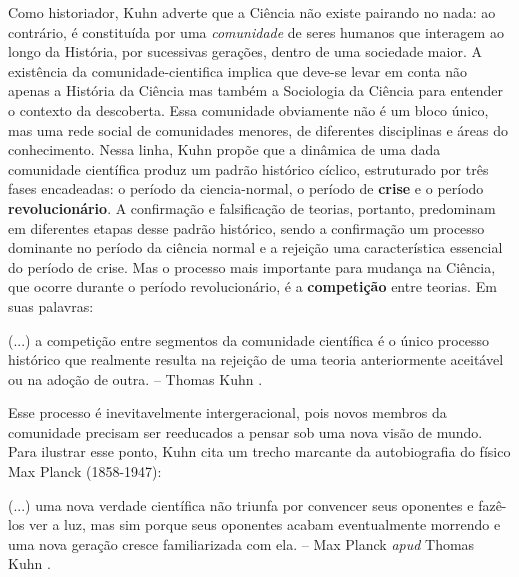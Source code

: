 \documentclass[./main.tex]{subfiles}
\begin{document}
\par Como historiador, Kuhn adverte que a Ciência não existe pairando no nada: ao contrário, é constituída por uma \textit{comunidade} de seres humanos que interagem ao longo da História, por sucessivas gerações, dentro de uma sociedade maior. A existência da \gls{comunidade-cientifica} implica que deve-se levar em conta não apenas a História da Ciência mas também a Sociologia da Ciência para entender o contexto da descoberta. Essa comunidade obviamente não é um bloco único, mas uma rede social de comunidades menores, de diferentes disciplinas e áreas do conhecimento. Nessa linha, Kuhn propõe que a dinâmica de uma dada comunidade científica produz um padrão histórico cíclico, estruturado por três fases encadeadas: o período da \gls{ciencia-normal}, o período de \textbf{crise} e o período \textbf{revolucionário}. A confirmação e falsificação de teorias, portanto, predominam em diferentes etapas desse padrão histórico, sendo a confirmação um processo dominante no período da ciência normal e a rejeição uma característica essencial do período de crise. Mas o processo mais importante para mudança na Ciência, que ocorre durante o período revolucionário, é a \textbf{competição} entre teorias. Em suas palavras:

\begin{adjustwidth}{100pt}{0pt}
\medskip
\small (...) a competição entre segmentos da comunidade científica é o único processo histórico que realmente resulta na rejeição de uma teoria anteriormente aceitável ou na adoção de outra. -- Thomas Kuhn \cite{kuhn2012structure}.
\medskip
\end{adjustwidth}

\noindent Esse processo é inevitavelmente intergeracional, pois novos membros da comunidade precisam ser reeducados a pensar sob uma nova visão de mundo. Para ilustrar esse ponto, Kuhn cita um trecho marcante da autobiografia do físico Max Planck (1858-1947):

\begin{adjustwidth}{100pt}{0pt}
\medskip
\small (...) uma nova verdade científica não triunfa por convencer seus oponentes e fazê-los ver a luz, mas sim porque seus oponentes acabam eventualmente morrendo e uma nova geração cresce familiarizada com ela. -- Max Planck \textit{apud} Thomas Kuhn \cite{kuhn2012structure}.
\medskip
\end{adjustwidth}
\end{document}
